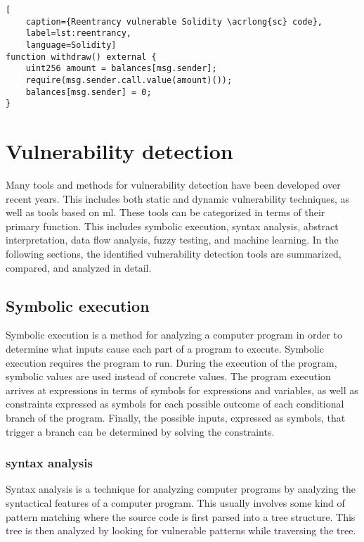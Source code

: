 \begin{lstlisting}[
    caption={Reentrancy vulnerable Solidity \acrlong{sc} code},
    label=lst:reentrancy,
    language=Solidity]
function withdraw() external {
    uint256 amount = balances[msg.sender];
    require(msg.sender.call.value(amount)());
    balances[msg.sender] = 0;
}   
\end{lstlisting}


\section{Vulnerability detection}
\label{sec:vulnerability-detection}
Many tools and methods for vulnerability detection have been developed over recent years. This includes both static and dynamic vulnerability techniques, as well as tools based on \acrfull{ml}. These tools can be categorized in terms of their primary function. This includes symbolic execution, syntax analysis, abstract interpretation, data flow analysis, fuzzy testing, and machine learning. In the following sections, the identified vulnerability detection tools are summarized, compared, and analyzed in detail.

\subsection{Symbolic execution}
\label{sec:symbolic-execution}
Symbolic execution is a method for analyzing a computer program in order to determine what inputs cause each part of a program to execute. Symbolic execution requires the program to run. During the execution of the program, symbolic values are used instead of concrete values. The program execution arrives at expressions in terms of symbols for expressions and variables, as well as constraints expressed as symbols for each possible outcome of each conditional branch of the program. Finally, the possible inputs, expressed as symbols, that trigger a branch can be determined by solving the constraints.

\subsubsection{syntax analysis}
\label{sec:syntax-analysis}
Syntax analysis is a technique for analyzing computer programs by analyzing the syntactical features of a computer program. This usually involves some kind of pattern matching where the source code is first parsed into a tree structure. This tree is then analyzed by looking for vulnerable patterns while traversing the tree.

